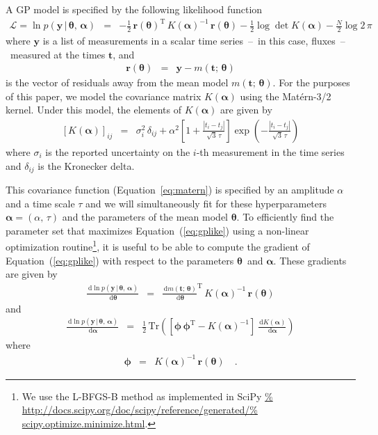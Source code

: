 \documentclass[manuscript, letterpaper]{aastex6}
\renewcommand{\eqref}[1]{\ref{eq:#1}}
\newcommand{\Eq}[1]{Equation~(\eqref{#1})}
\newcommand{\eq}[1]{\Eq{#1}}
\newcommand{\eqalt}[1]{Equation~\eqref{#1}}
\newcommand{\eqlabel}[1]{\label{eq:#1}}
\newcommand{\T}{\ensuremath{\mathrm{T}}}
\newcommand{\dd}{\ensuremath{\,\mathrm{d}}}
\newcommand{\bvec}[1]{{\ensuremath{\boldsymbol{#1}}}}
\newcommand{\meanpars}{{\ensuremath{\bvec{\theta}}}}
\newcommand{\kernpars}{{\ensuremath{\bvec{\alpha}}}}
\begin{document}
A GP model is specified by the following likelihood function
\begin{eqnarray}\eqlabel{gplike}
\mathcal{L} = \ln p(\bvec{y}\,|\,\meanpars,\,\kernpars) &=&
- \frac{1}{2}\,\bvec{r}(\meanpars)^\T\,K(\kernpars)^{-1}\,
    \bvec{r}(\meanpars)
- \frac{1}{2}\log\det K(\kernpars) - \frac{N}{2} \log{2\,\pi}
\end{eqnarray}
where \bvec{y} is a list of measurements in a scalar time series~--~in this
case, fluxes~--~measured at the times \bvec{t}, and
\begin{eqnarray}
\bvec{r}(\meanpars) &=& \bvec{y} - m(\bvec{t};\,\meanpars)
\end{eqnarray}
is the vector of residuals away from the mean model $m(\bvec{t};\,\meanpars)$.
For the purposes of this paper, we model the covariance matrix $K(\kernpars)$
using the Mat\'ern-3/2 kernel.
Under this model, the elements of $K(\kernpars)$ are given by
\begin{eqnarray}\eqlabel{matern}
\left[ K(\kernpars) \right]_{ij} &=& \sigma_i^2\,\delta_{ij}
    + \alpha^2 \left[ 1+\frac{|t_i - t_j|}{\sqrt{3}\,\tau} \right]
      \exp \left(-\frac{|t_i - t_j|}{\sqrt{3}\,\tau}\right)
\end{eqnarray}
where $\sigma_i$ is the reported uncertainty on the $i$-th measurement in the
time series and $\delta_{ij}$ is the Kronecker delta.

This covariance function (\eqalt{matern}) is specified by an amplitude
$\alpha$ and a time scale $\tau$ and we will simultaneously fit for these
hyperparameters $\kernpars=(\alpha,\,\tau)$ and the parameters of the mean
model \meanpars.
To efficiently find the parameter set that maximizes \eq{gplike} using a
non-linear optimization routine\footnote{We use the L-BFGS-B method as
implemented in SciPy \url{%
http://docs.scipy.org/doc/scipy/reference/generated/%
scipy.optimize.minimize.html}.},
it is useful to be able to compute the gradient of \eq{gplike} with respect to
the parameters \meanpars\ and \kernpars.
These gradients are given by
\begin{eqnarray}\eqlabel{gpmeangrad}
\frac{\dd\ln p(\bvec{y}\,|\,\meanpars,\,\kernpars)}{\dd \meanpars} &=&
\frac{\dd m(\bvec{t};\,\meanpars)}{\dd\meanpars}^\T \, K(\kernpars)^{-1} \,
    \bvec{r}(\meanpars)
\end{eqnarray}
and
\begin{eqnarray}
\frac{\dd\ln p(\bvec{y}\,|\,\meanpars,\,\kernpars)}{\dd \kernpars} &=&
\frac{1}{2}\,\mathrm{Tr}\left(
    \left[ \bvec{\phi}\,\bvec{\phi}^\T - K(\kernpars)^{-1} \right]
    \,\frac{\dd K(\kernpars)}{\dd\kernpars}
\right)
\end{eqnarray}
where
\begin{eqnarray}
\bvec{\phi} &=& K(\kernpars)^{-1}\,\bvec{r}(\meanpars) \quad.
\end{eqnarray}



\end{document}
